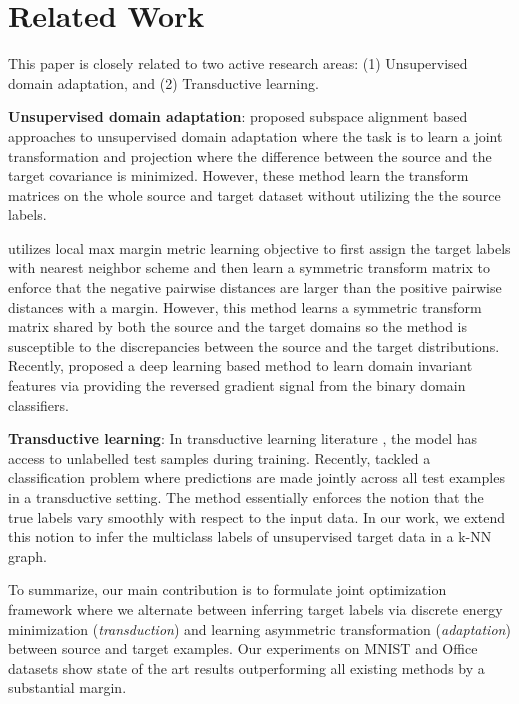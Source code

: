\documentclass{article}
\begin{document}
\section{Related Work} 

This paper is closely related to two active research areas: (1) Unsupervised domain adaptation, and (2) Transductive learning.

\textbf{Unsupervised domain adaptation}: \cite{gong12, baochen15, fernando13, baochen16} proposed subspace alignment based approaches to unsupervised domain adaptation where the task is to learn a joint transformation and projection where the difference between the source and the target covariance is minimized. However, these method learn the transform matrices on the whole source and target dataset without utilizing the the source labels. 

\cite{tommasi13} utilizes local max margin metric learning objective \cite{lmnn} to first assign the target labels with nearest neighbor scheme and then learn a symmetric transform matrix to enforce that the negative pairwise distances are larger than the positive pairwise distances with a margin. However, this method learns a symmetric transform matrix shared by both the source and the target domains so the method is susceptible to the discrepancies between the source and the target distributions. Recently, \cite{ganin15, tzeng14} proposed a deep learning based method to learn domain invariant features via providing the reversed gradient signal from the binary domain classifiers.

\textbf{Transductive learning}: In transductive learning literature \cite{transduction}, the model has access to unlabelled test samples during training. Recently, \cite{coclassification} tackled a classification problem where predictions are made jointly across all test examples in a transductive \cite{transduction} setting. The method essentially enforces the notion that the true labels vary smoothly with respect to the input data. In our work, we extend this notion to infer the multiclass labels of unsupervised target data in a k-NN graph. 

To summarize, our main contribution is to formulate joint optimization framework where we alternate between inferring target labels via discrete energy minimization (\textit{transduction}) and learning asymmetric transformation (\textit{adaptation}) between source and target examples. Our experiments on MNIST \cite{mnist} and Office \cite{office} datasets show state of the art results outperforming all existing methods by a substantial margin.
\end{document}
